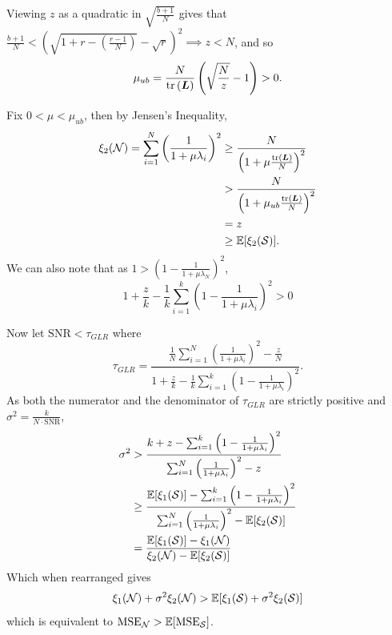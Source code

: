 Viewing $z$ as a quadratic in $\sqrt{\frac{b+1}{N}}$ gives that  $\frac{b+1}{N} < (\sqrt{1+r-\left(\frac{r-1}{N}\right)} - \sqrt{r})^{2} \implies z < N$, 
and so
\begin{equation}
        \mu_{ub} = \frac{N}{\textrm{tr}\left(\bm{L}\right)} \left( \sqrt{\frac{N}{z}}  -1 \right) > 0.
\end{equation}

Fix $0 < \mu < \mu_{ub}$, then by Jensen's Inequality,
\begin{align}
    \xi_{2}(\mathcal{N}) = \sum_{i=1}^{N}\left(\frac{1}{1 + \mu\lambda_{i}}\right)^{2} &\geq \frac{N}{\left(1+\mu\frac{\textrm{tr}\left( \bm{L}
 \right)}{N}  \right)^{2}}\\
    &> \frac{N}{\left(1+\mu_{ub}\frac{\textrm{tr}\left( \bm{L}
 \right)}{N} 
  \right)^{2}}\\ 
    &= z\\
    &\geq \mathbb{E}[\xi_{2}(\mathcal{S})].
\end{align}
We can also note that as $1 > \left(1 - \frac{1}{1+\mu\lambda_{N}}\right)^{2}$,
\begin{equation}
    1 + \frac{z}{k} - \frac{1}{k}\sum_{i=1}^{k}\left( 1 - \frac{1}{1 + \mu \lambda_{i}}\right)^{2} >0 \label{eq:xi_1_S_bound_greater_than_xi_1_N}
\end{equation}

Now let $\textrm{SNR}<\tau_{GLR}$ where
\begin{equation}
        \tau_{GLR} = \frac{\frac{1}{N}\sum_{i=1}^{N}\left(\frac{1}{1 + \mu \lambda_{i}}\right)^{2} - \frac{z}{N} }{1 + \frac{z}{k} - \frac{1}{k}\sum_{i=1}^{k}\left( 1 - \frac{1}{1 + \mu \lambda_{i}}\right)^{2} }.
\end{equation}
As both the numerator and the denominator of $\tau_{GLR}$ are strictly positive and $\sigma^{2} = \frac{k}{N \cdot \text{SNR}}$,
\begin{align}
    \sigma^{2} &> \frac{k + z  - \sum_{i=1}^{k}\left( 1 - \frac{1}{1 + \mu \lambda_{i}}\right)^{2} }{\sum_{i=1}^{N}\left(\frac{1}{1 + \mu \lambda_{i}}\right)^{2} - z} \\
    &\geq \frac{\mathbb{E}[\xi_{1}(\mathcal{S})] - \sum_{i=1}^{k}\left( 1 - \frac{1}{1 + \mu \lambda_{i}}\right)^{2}}{\sum_{i=1}^{N}\left(\frac{1}{1 + \mu \lambda_{i}}\right)^{2} - \mathbb{E}[\xi_{2}(\mathcal{S})]} \\
    &= \frac{\mathbb{E}[\xi_{1}(\mathcal{S})] - \xi_{1}(\mathcal{N})}{\xi_{2}(\mathcal{N}) - \mathbb{E}[\xi_{2}(\mathcal{S})]}
\end{align}
Which when rearranged gives
\begin{equation}
    \xi_{1}(\mathcal{N}) + \sigma^{2}\xi_{2}(\mathcal{N}) > \mathbb{E}[\xi_{1}(\mathcal{S}) + \sigma^{2}\xi_{2}(\mathcal{S})]
\end{equation}
which is equivalent to $\textrm{MSE}_{\mathcal{N}} > \mathbb{E}[\textrm{MSE}_{\mathcal{S}}]$.
\fi

